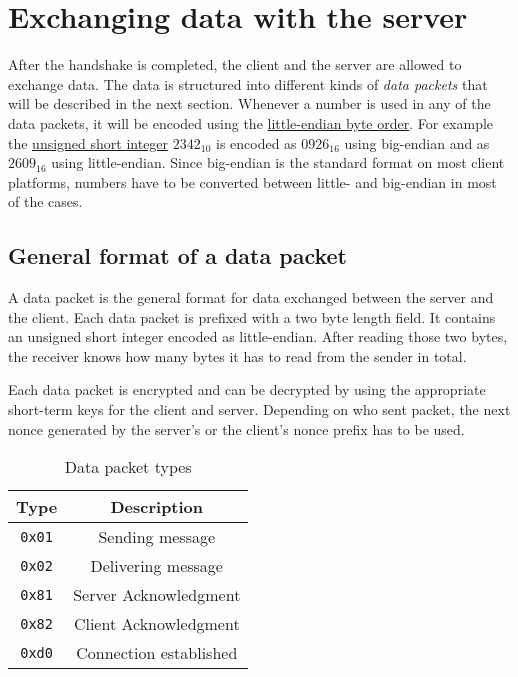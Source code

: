 \documentclass[11pt,a4paper,bookmarksopen=true]{article}
\begin{document}
\section{Exchanging data with the server}\label{sec:data}

After the handshake is completed, the client and the server are allowed to exchange data.
The data is structured into different kinds of \textit{data packets} that will be described in the next section.
Whenever a number is used in any of the data packets, it will be encoded  using the
\href{https://en.wikipedia.org/wiki/Endianness}{little-endian byte
  order}.
For example the
\href{https://en.wikipedia.org/wiki/Integer\_%28computer\_science%29#Short\_integer}
{unsigned short integer} $2342_{10}$ is encoded as
$0926_{16}$ using big-endian and as $2609_{16}$ using
little-endian. Since big-endian is the standard format on most client
platforms, numbers have to be converted between little- and big-endian in most of the cases.

\subsection{General format of a data packet}

A data packet is the general format for data exchanged between the server and the client.
Each data packet is prefixed with a two byte length field.
It contains an unsigned short integer encoded as little-endian.
After reading those two bytes, the receiver knows how
many bytes it has to read from the sender in total.

Each data packet is encrypted and can be decrypted by using the appropriate
short-term keys for the client and server.
Depending on who sent packet, the next nonce generated by the server's
or the client's nonce prefix has to be used.

\begin{table}[h]
  \centering
  \begin{tabular}{|c |c|}
    \hline
    Type          & Description              \\ \hline
    \texttt{0x01} & Sending message          \\ \hline
    \texttt{0x02} & Delivering message       \\ \hline \hline
    \texttt{0x81} & Server Acknowledgment    \\ \hline
    \texttt{0x82} & Client Acknowledgment    \\ \hline \hline
    \texttt{0xd0} & Connection established   \\ \hline
  \end{tabular}
  \caption{Data packet types}
  \label{tb:data_packet_types}
\end{table}
\end{document}

